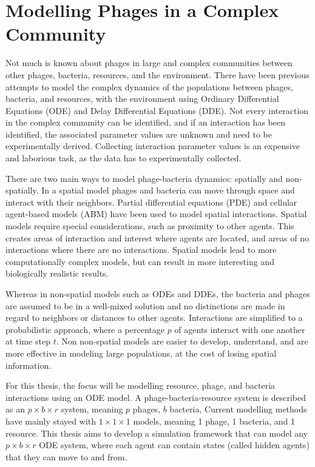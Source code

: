 \section{Modelling Phages in a Complex Community}
Not much is known about phages in large and complex communities between other phages, bacteria, resources, and the environment. 
There have been previous attempts to model the complex dynamics of the populations between phages, bacteria, and resources, with the environment using Ordinary Differential Equations (ODE) and Delay Differential Equations (DDE).
Not every interaction in the complex community can be identified, and if an interaction has been identified, the associated parameter values are unknown and need to be experimentally derived. 
Collecting interaction parameter values is an expensive and laborious task, as the data has to experimentally collected. 

There are two main ways to model phage-bacteria dynamics: spatially and non-spatially.
In a spatial model phages and bacteria can move through space and interact with their neighbors. 
Partial differential equations (PDE) and cellular agent-based models (ABM) have been used to model spatial interactions.
Spatial models require special considerations, such as proximity to other agents.
This creates areas of interaction and interest where agents are located, and areas of no interactions where there are no interactions.
Spatial models lead to more computationally complex models, but can result in more interesting and biologically realistic results. 

Whereas in non-spatial models such as ODEs and DDEs, the bacteria and phages are assumed to be in a well-mixed solution and no distinctions are made in regard to neighbors or distances to other agents. 
Interactions are simplified to a probabilistic approach, where a percentage $p$ of agents interact with one another at time step $t$.
Non non-spatial models are easier to develop, understand, and are more effective in modeling large populations, at the cost of losing spatial information. 

For this thesis, the focus will be modelling resource, phage, and bacteria interactions using an ODE model. 
A phage-bacteria-resource system is described as an $p\times b \times r$ system, meaning $p$ phages, $b$ bacteria, 
Current modelling methods have mainly stayed with $1\times 1 \times 1$ models, meaning 1 phage, 1 bacteria, and 1 resource. 
This thesis aims to develop a simulation framework that can model any $p\times b \times r$ ODE system, where each agent can contain states (called hidden agents) that they can move to and from. 
\newline 


